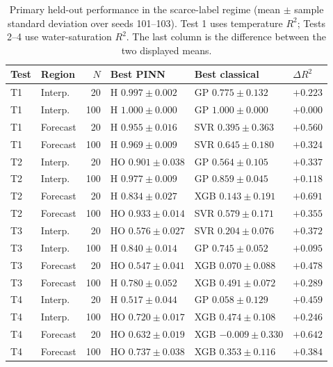 \begin{table}[t]
\centering
\footnotesize
\setlength{\tabcolsep}{4.5pt}
\caption{Primary held-out performance in the scarce-label regime (mean $\pm$ sample standard deviation over seeds 101--103). Test 1 uses temperature $R^2$; Tests 2--4 use water-saturation $R^2$. The last column is the difference between the two displayed means.}
\label{tab:primary_summary}
\begin{tabular}{@{}llrlll@{}}
\toprule
Test & Region & $N$ & Best PINN & Best classical & $\Delta R^2$ \\
\midrule
T1 & Interp. & 20 & H $0.997\pm0.002$ & GP $0.775\pm0.132$ & $+0.223$ \\
T1 & Interp. & 100 & H $1.000\pm0.000$ & GP $1.000\pm0.000$ & $+0.000$ \\
T1 & Forecast & 20 & H $0.955\pm0.016$ & SVR $0.395\pm0.363$ & $+0.560$ \\
T1 & Forecast & 100 & H $0.969\pm0.009$ & SVR $0.645\pm0.180$ & $+0.324$ \\
\addlinespace[1.5pt]
T2 & Interp. & 20 & HO $0.901\pm0.038$ & GP $0.564\pm0.105$ & $+0.337$ \\
T2 & Interp. & 100 & H $0.977\pm0.009$ & GP $0.859\pm0.045$ & $+0.118$ \\
T2 & Forecast & 20 & H $0.834\pm0.027$ & XGB $0.143\pm0.191$ & $+0.691$ \\
T2 & Forecast & 100 & HO $0.933\pm0.014$ & SVR $0.579\pm0.171$ & $+0.355$ \\
\addlinespace[1.5pt]
T3 & Interp. & 20 & HO $0.576\pm0.027$ & SVR $0.204\pm0.076$ & $+0.372$ \\
T3 & Interp. & 100 & H $0.840\pm0.014$ & GP $0.745\pm0.052$ & $+0.095$ \\
T3 & Forecast & 20 & HO $0.547\pm0.041$ & XGB $0.070\pm0.088$ & $+0.478$ \\
T3 & Forecast & 100 & H $0.780\pm0.052$ & XGB $0.491\pm0.072$ & $+0.289$ \\
\addlinespace[1.5pt]
T4 & Interp. & 20 & H $0.517\pm0.044$ & GP $0.058\pm0.129$ & $+0.459$ \\
T4 & Interp. & 100 & HO $0.720\pm0.017$ & XGB $0.474\pm0.108$ & $+0.246$ \\
T4 & Forecast & 20 & HO $0.632\pm0.019$ & XGB $-0.009\pm0.330$ & $+0.642$ \\
T4 & Forecast & 100 & HO $0.737\pm0.038$ & XGB $0.353\pm0.116$ & $+0.384$ \\
\bottomrule
\end{tabular}
\end{table}
